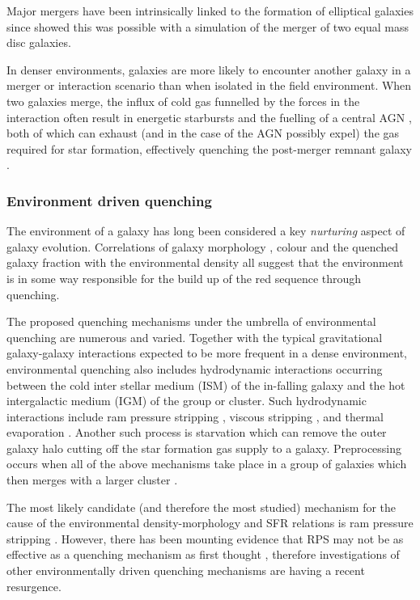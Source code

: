Major mergers have been intrinsically linked to the formation of elliptical galaxies since \citet{toomre72} showed this was possible with a simulation of the merger of two equal mass disc galaxies.

In denser environments, galaxies are more likely to encounter another galaxy in a merger or interaction scenario than when isolated in the field environment. When two galaxies merge, the influx of cold gas funnelled by the forces in the interaction often result in energetic starbursts and the fuelling of a central AGN \citep{hopkins05}, both of which can exhaust  (and in the case of the AGN possibly expel) the gas required for star formation, effectively quenching the post-merger remnant galaxy \citep{pontzen16}. 

\subsubsection{Environment driven quenching}\label{sec:envquench}

The environment of a galaxy has long been considered a key  \emph{nurturing} aspect of galaxy evolution. Correlations of galaxy morphology \citep{dressler80, smail97, poggianti99, postman05, Bamford09}, colour \citep{butcher78, pimbblet02} and the quenched galaxy fraction \citep{kauffmann03, Baldry06, peng12, darvish16} with the environmental density all suggest that the environment is in some way responsible for the build up of the red sequence through quenching. 

The proposed quenching mechanisms under the umbrella of environmental quenching are numerous and varied. Together with the typical gravitational galaxy-galaxy interactions \citep{moore96} expected to be more frequent in a dense environment, environmental quenching also includes hydrodynamic interactions occurring between the cold inter stellar medium (ISM) of the in-falling galaxy and the hot intergalactic medium (IGM) of the group or cluster. Such hydrodynamic interactions include ram pressure stripping \citep{gunngott72}, viscous stripping \citep{nulsen82}, and thermal evaporation \citep[a rapid rise in temperature of the ISM due to contact with the IGM;][]{cowie77}. Another such process is starvation \citep{larson80} which can remove the outer galaxy halo cutting off the star formation gas supply to a galaxy. Preprocessing occurs when all of the above mechanisms take place in a group of galaxies which then merges with a larger cluster \citep{dressler04}. 

The most likely candidate (and therefore the most studied) mechanism for the cause of the environmental density-morphology and SFR relations is ram pressure stripping \citep[RPS;][]{abadi99, poggianti99}. However, there has been mounting evidence that RPS may not be as effective as a quenching mechanism as first thought \citep{emerick16, fillingham16}, therefore investigations of other environmentally driven quenching mechanisms are having a recent resurgence. 


